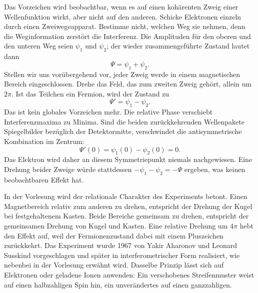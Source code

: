 Das Vorzeichen wird beobachtbar, wenn es auf einen kohärenten Zweig einer Wellenfunktion wirkt, aber nicht auf den anderen. Schicke Elektronen einzeln durch einen Zweiwegeapparat. Bestimme nicht, welchen Weg sie nehmen, denn die Weginformation zerstört die Interferenz. Die Amplituden für den oberen und den unteren Weg seien \(\psi_1\) und \(\psi_2\); der wieder zusammengeführte Zustand lautet dann
\begin{equation}
\Psi=\psi_1+\psi_2.
\end{equation}
Stellen wir uns vorübergehend vor, jeder Zweig werde in einem magnetischen Bereich eingeschlossen. Drehe das Feld, das zum zweiten Zweig gehört, allein um \(2\pi\). Ist das Teilchen ein Fermion, wird der Zustand zu
\begin{equation}
\Psi'=\psi_1-\psi_2.
\end{equation}
Das ist kein globales Vorzeichen mehr. Die relative Phase verschiebt Interferenzmaxima zu Minima. Sind die beiden zurückkehrenden Wellenpakete Spiegelbilder bezüglich der Detektormitte, verschwindet die antisymmetrische Kombination im Zentrum:
\begin{equation}
\Psi'(0)=\psi_1(0)-\psi_2(0)=0.
\end{equation}
Das Elektron wird daher an diesem Symmetriepunkt niemals nachgewiesen. Eine Drehung beider Zweige würde stattdessen \(-\psi_1-\psi_2=-\Psi\) ergeben, was keinen beobachtbaren Effekt hat.

In der Vorlesung wird der relationale Charakter des Experiments betont. Einen Magnetbereich relativ zum anderen zu drehen, entspricht der Drehung der Kugel bei festgehaltenem Kasten. Beide Bereiche gemeinsam zu drehen, entspricht der gemeinsamen Drehung von Kugel und Kasten. Eine relative Drehung um \(4\pi\) hebt den Effekt auf, weil der Fermionenzustand dabei mit einem Pluszeichen zurückkehrt. Das Experiment wurde 1967 von Yakir Aharonov und Leonard Susskind vorgeschlagen und später in interferometrischer Form realisiert, wie nebenbei in der Vorlesung erwähnt wird. Dasselbe Prinzip lässt sich auf Elektronen oder geladene Ionen anwenden: Ein verschobenes Streifenmuster weist auf einen halbzahligen Spin hin, ein unverändertes auf einen ganzzahligen.

\begin{classroomqa}
\end{classroomqa}

